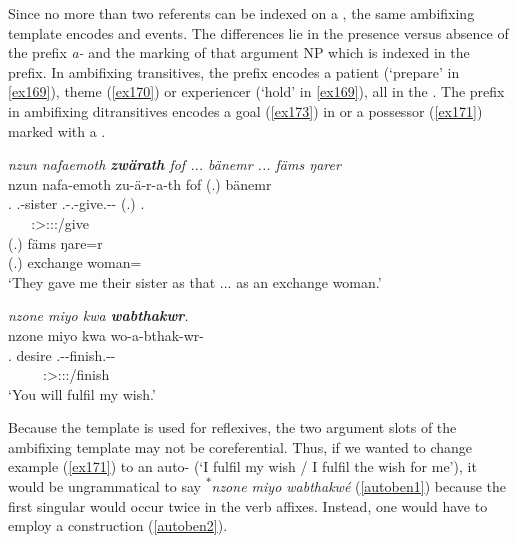 Since no more than two referents can be indexed on a , the same ambifixing template encodes  and  events. The differences lie in the presence versus absence of the  prefix \emph{a-} and the  marking of that argument NP which is indexed in the prefix. In ambifixing transitives, the prefix encodes a patient (`prepare' in \ref{ex169}), theme (\ref{ex170}) or experiencer (`hold' in \ref{ex169}), all in the . The prefix in ambifixing ditransitives encodes a goal (\ref{ex173}) in   or a possessor (\ref{ex171}) marked with a .

\begin{exe}
	\ex \emph{nzun nafaemoth \textbf{zwärath} fof ... bänemr ... fäms ŋarer}\\
	\glll nzun nafa-emoth zu-ä-r-a-th fof (.) bänemr\\
	\Fsg.{\Dat} \Third.\Poss-sister \Fsg.\Gam-\Vc.\Ndu-give.\Rs-\Pst-\Stnsg{} {\Emph} (.) \Recog.{\Purp}\\
	~ ~ {\footnotesize \Stpl:\Sbj>\Fsg:\Io:\Pst:\Pfv/give} ~ ~ ~ ~ ~\\
	\sn
	\gll (.) fäms ŋare=r\\
	(.) exchange woman=\Purp\\
	\trans `They gave me their sister as that ... as an exchange woman.'\\ 
	\label{ex173}
\end{exe}
\begin{exe}
	\ex \emph{nzone miyo kwa \textbf{wabthakwr}.}\\
	\glll nzone miyo kwa wo-a-bthak-wr-\Zero{}\\
	\Fsg.{\Poss} desire {\Fut} \Fsg.\Alph-\Vc-finish.\Ext-\Ndu-\Stsg{}\\
	~ ~ ~ {\footnotesize \Stsg:\Sbj>\Fsg:\Io:\Nonpast:\Ipfv/finish}\\
	\trans `You will fulfil my wish.' 
	\label{ex171}
\end{exe}

Because the  template is used for reflexives, the two argument slots of the ambifixing template may not be coreferential. Thus, if we wanted to change example (\ref{ex171}) to an auto- (`I fulfil my wish / I fulfil the wish for me'), it would be ungrammatical to say \textsuperscript{$\ast$}\emph{nzone miyo wabthakwé} (\ref{autoben1}) because the first singular would occur twice in the verb affixes. Instead, one would have to employ a  construction (\ref{autoben2}).

